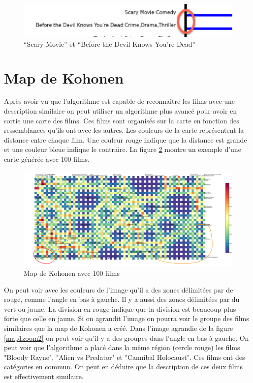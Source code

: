 \begin{figure}[h]
  \centering
    \includegraphics[width=0.5\linewidth]{img/scarymovie.png}
  \caption{``Scary Movie'' et ``Before the Devil Knows You're Dead''}
  \label{scarymovie}
\end{figure}



\section{Map de Kohonen}

Après avoir vu que l'algorithme est capable de reconnaître les films avec une description similaire on peut utiliser un algorithme plus avancé pour avoir en sortie une carte des films. Ces films sont organisés sur la carte en fonction des ressemblances qu'ils ont avec les autres. Les couleurs de la carte représentent la distance entre chaque film. Une couleur rouge indique que la distance est grande et une couleur bleue indique le contraire. La figure \ref{map1} montre un exemple d'une carte générée avec 100 films.

\begin{figure}[h]
  \centering
  \includegraphics[width=1\linewidth]{img/map-cluster.png}
  \caption{Map de Kohonen avec 100 films}
  \label{map1}
\end{figure}

On peut voir avec les couleurs de l'image qu'il a des zones délimitées par de rouge, comme l'angle en bas à gauche. Il y a aussi des zones délimitées par du vert ou jaune. La division en rouge indique que la division est beaucoup plus forte que celle en jaune. Si on agrandit l'image on pourra voir le groupe des films similaires que la map de Kohonen a créé.
Dans l'image agrandie de la figure \ref{map1zoom2} on peut voir qu'il y a des groupes dans l'angle en bas à gauche. On peut voir que l'algorithme a placé dans la même région (cercle rouge) les films "Bloody Rayne", "Alien vs Predator" et "Cannibal Holocaust". Ces films ont des catégories en commun. On peut en déduire que la description de ces deux films est effectivement similaire.

